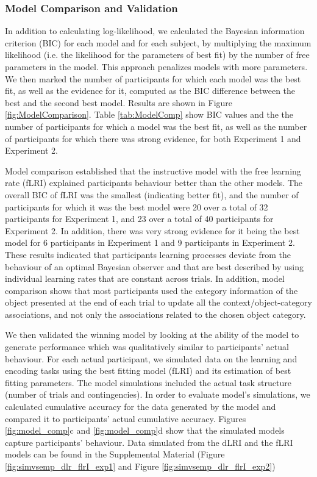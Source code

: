 \documentclass[a4paper,12pt]{article}
\begin{document}
\subsubsection{Model Comparison and Validation}
In addition to calculating log-likelihood, we calculated the Bayesian information criterion (BIC) for each model and for each subject, by multiplying the maximum likelihood (i.e. the likelihood for the parameters of best fit) by the number of free parameters in the model. This approach penalizes models with more parameters. We then marked the number of participants for which each model was the best fit, as well as the evidence for it, computed as the BIC difference between the best and the second best model. Results are shown in Figure \ref{fig:ModelComparison}. Table \ref{tab:ModelComp} show BIC values and the the number of participants for which a model was the best fit, as well as the number of participants for which there was strong evidence, for both Experiment 1 and Experiment 2. 


Model comparison established that the instructive model with the free learning rate (fLRI) explained participants behaviour better than the other models. The overall BIC of fLRI was the smallest (indicating better fit), and the number of participants for which it was the best model were 20 over a total of 32 participants for Experiment 1, and 23 over a total of 40 participants for Experiment 2. In addition, there was very strong evidence for it being the best model for 6 participants in Experiment 1 and 9 participants in Experiment 2. %
These results indicated that participants learning processes deviate from the behaviour of an optimal Bayesian observer and that are best described by using individual learning rates that are constant across trials. In addition, model comparison shows that most participants used the category information of the object presented at the end of each trial to update all the context/object-category associations, and not only the associations related to the chosen object category.
\par
We then validated the winning model by looking at the ability of the model to generate performance which was qualitatively similar to participants' actual behaviour. For each actual participant, we simulated data on the learning and encoding tasks using the best fitting model (fLRI) and its estimation of best fitting parameters. The model simulations included the actual task structure (number of trials and contingencies). In order to evaluate model's simulations, we calculated cumulative accuracy for the data generated by the model and compared it to participants' actual cumulative accuracy. Figures \ref{fig:model_comp}c and \ref{fig:model_comp}d show that the simulated models capture participants' behaviour. Data simulated from the dLRI and the fLRI models can be found in the Supplemental Material (Figure  \ref{fig:simvsemp_dlr_flrI_exp1} and Figure \ref{fig:simvsemp_dlr_flrI_exp2})
\end{document}
